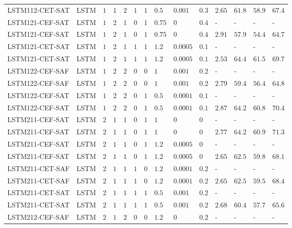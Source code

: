 \begin{table}[tbp]
\begin{tabular}{llllllllllllll}
LSTM112-CET-SAT & LSTM & $1$ & $1$ & $2$ & $1$ & $1$ & $0.5$ & $0.001$ & $0.3$ & $2.65$ & $61.8$ & $58.9$ & $67.4$ \\
LSTM121-CEF-SAT & LSTM & $1$ & $2$ & $1$ & $0$ & $1$ & $0.75$ & $0$ & $0.4$ & - & - & - & - \\
LSTM121-CEF-SAT & LSTM & $1$ & $2$ & $1$ & $0$ & $1$ & $0.75$ & $0$ & $0.4$ & $2.91$ & $57.9$ & $54.4$ & $64.7$ \\
LSTM121-CET-SAT & LSTM & $1$ & $2$ & $1$ & $1$ & $1$ & $1.2$ & $0.0005$ & $0.1$ & - & - & - & - \\
LSTM121-CET-SAT & LSTM & $1$ & $2$ & $1$ & $1$ & $1$ & $1.2$ & $0.0005$ & $0.1$ & $2.53$ & $64.4$ & $61.5$ & $69.7$ \\
LSTM122-CEF-SAF & LSTM & $1$ & $2$ & $2$ & $0$ & $0$ & $1$ & $0.001$ & $0.2$ & - & - & - & - \\
LSTM122-CEF-SAF & LSTM & $1$ & $2$ & $2$ & $0$ & $0$ & $1$ & $0.001$ & $0.2$ & $2.79$ & $59.4$ & $56.4$ & $64.8$ \\
LSTM122-CEF-SAT & LSTM & $1$ & $2$ & $2$ & $0$ & $1$ & $0.5$ & $0.0001$ & $0.1$ & - & - & - & - \\
LSTM122-CEF-SAT & LSTM & $1$ & $2$ & $2$ & $0$ & $1$ & $0.5$ & $0.0001$ & $0.1$ & $2.87$ & $64.2$ & $60.8$ & $70.4$ \\
LSTM211-CEF-SAT & LSTM & $2$ & $1$ & $1$ & $0$ & $1$ & $1$ & $0$ & $0$ & - & - & - & - \\
LSTM211-CEF-SAT & LSTM & $2$ & $1$ & $1$ & $0$ & $1$ & $1$ & $0$ & $0$ & $2.77$ & $64.2$ & $60.9$ & $71.3$ \\
LSTM211-CEF-SAT & LSTM & $2$ & $1$ & $1$ & $0$ & $1$ & $1.2$ & $0.0005$ & $0$ & - & - & - & - \\
LSTM211-CEF-SAT & LSTM & $2$ & $1$ & $1$ & $0$ & $1$ & $1.2$ & $0.0005$ & $0$ & $2.65$ & $62.5$ & $59.8$ & $68.1$ \\
LSTM211-CET-SAF & LSTM & $2$ & $1$ & $1$ & $1$ & $0$ & $1.2$ & $0.0001$ & $0.2$ & - & - & - & - \\
LSTM211-CET-SAF & LSTM & $2$ & $1$ & $1$ & $1$ & $0$ & $1.2$ & $0.0001$ & $0.2$ & $2.65$ & $62.5$ & $59.5$ & $68.4$ \\
LSTM211-CET-SAT & LSTM & $2$ & $1$ & $1$ & $1$ & $1$ & $0.5$ & $0.001$ & $0.2$ & - & - & - & - \\
LSTM211-CET-SAT & LSTM & $2$ & $1$ & $1$ & $1$ & $1$ & $0.5$ & $0.001$ & $0.2$ & $2.68$ & $60.4$ & $57.7$ & $65.6$ \\
LSTM212-CEF-SAF & LSTM & $2$ & $1$ & $2$ & $0$ & $0$ & $1.2$ & $0$ & $0.2$ & - & - & - & - \\

\end{tabular}
\end{table}
